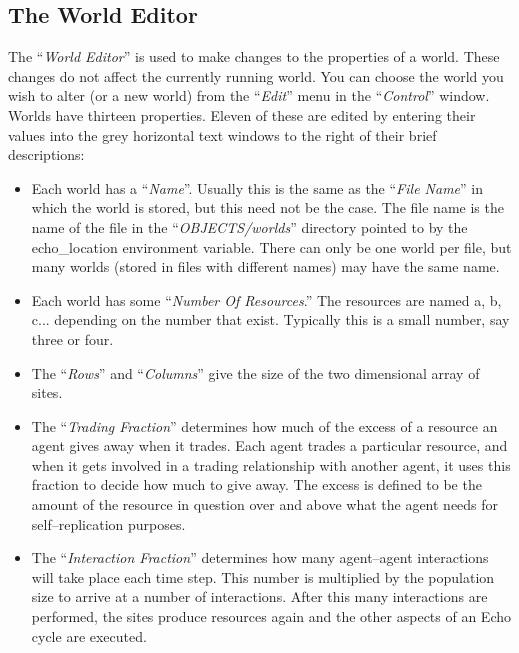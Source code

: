 \subsection{The World Editor}
\label{world-editor}

The ``{\sl World Editor}'' is used to make changes to the properties
of a world.  These changes do not affect the currently running
world. You can choose the world you wish to alter (or a new world)
from the ``{\sl Edit}'' menu in the ``{\sl Control}'' window. Worlds
have thirteen properties. Eleven of these are edited by entering their
values into the grey horizontal text windows to the right of their
brief descriptions:

\begin{itemize}

\item
Each world has a ``{\sl Name}''.  Usually this is
the same as the ``{\sl File Name}''  in which
the world is stored, but this need not be the case. The file name is
the name of the file in the ``{\sl OBJECTS/worlds}''  directory pointed to by the {\sc echo\_location} environment
variable. There can only be one world per file, but many worlds
(stored in files with different names) may have the same name.

\item
Each world has some ``{\sl Number Of Resources}.''   The resources are named a, b,
c... depending on the number that exist. Typically this is a small
number, say three or four.

\item
The ``{\sl Rows}''  and ``{\sl Columns}'' 
give the size of the two dimensional array of sites.  

\item
The ``{\sl Trading Fraction}''  determines how
much of the excess of a resource an agent gives away when it
trades. Each agent trades a particular resource, and when it gets
involved in a trading relationship with another agent, it uses this
fraction to decide how much to give away.  The excess  is defined to be the amount of the resource in question over
and above what the agent needs for self--replication purposes.

\item
The ``{\sl Interaction Fraction}'' 
determines how many agent--agent interactions will take place each
time step. This number is multiplied by the population size to arrive
at a number of interactions. After this many interactions are
performed, the sites produce resources again and the other aspects of
an Echo cycle are executed.


\end{itemize}
